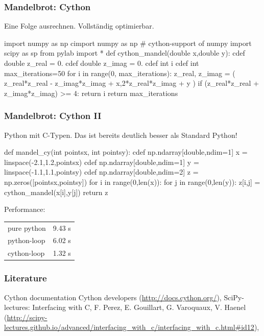 \documentclass[hyperref={xetex}]{beamer}
\begin{document}
\begin{frame}[fragile]\frametitle{Mandelbrot: Cython}
  Eine Folge ausrechnen. Vollständig optimierbar.
  \begin{pyin}
import numpy as np  
cimport numpy as np #  cython-support of numpy
import scipy as sp  
from pylab import *   
def cython_mandel(double x,double y):
    cdef double z_real = 0.
    cdef double z_imag = 0.
    cdef int i
    cdef int max_iterations=50
    for i in range(0, max_iterations):
        z_real, z_imag = ( z_real*z_real - z_imag*z_imag + x,2*z_real*z_imag + y )
        if (z_real*z_real + z_imag*z_imag) >= 4:
            return i
    return max_iterations    
  \end{pyin}
\end{frame}
 
  \begin{frame}[fragile]\frametitle{Mandelbrot: Cython II}
Python mit C-Typen. Das ist bereits deutlich besser als Standard Python!
    \begin{pyin}
def mandel_cy(int pointsx, int pointsy):
    cdef np.ndarray[double,ndim=1] x = linspace(-2.1,1.2,pointsx)
    cdef np.ndarray[double,ndim=1] y = linspace(-1.1,1.1,pointsy)
    cdef np.ndarray[double,ndim=2] z = np.zeros([pointsx,pointsy])
    for i in range(0,len(x)):
        for j in range(0,len(y)):        
            z[i,j] = cython_mandel(x[i],y[j])
    return z      
    \end{pyin}
    Performance:
    \begin{tabular}[c]{ll}
    pure python & 9.43 s \\
    python-loop & 6.02 s\\
    cython-loop & 1.32 s
  \end{tabular}
\end{frame}
    
\begin{frame}[fragile]\frametitle{Literature}
  \begin{thebibliography}{10}
      \small
     \alert{Cython documentation} Cython developers (\url{http://docs.cython.org/}),
     \alert{SciPy-lectures: Interfacing with C}, F. Perez, E. Gouillart, G. Varoquaux, V. Haenel (\url{http://scipy-lectures.github.io/advanced/interfacing_with_c/interfacing_with_c.html#id12}),
  \end{thebibliography}
  
\end{frame}

  
\end{document}
